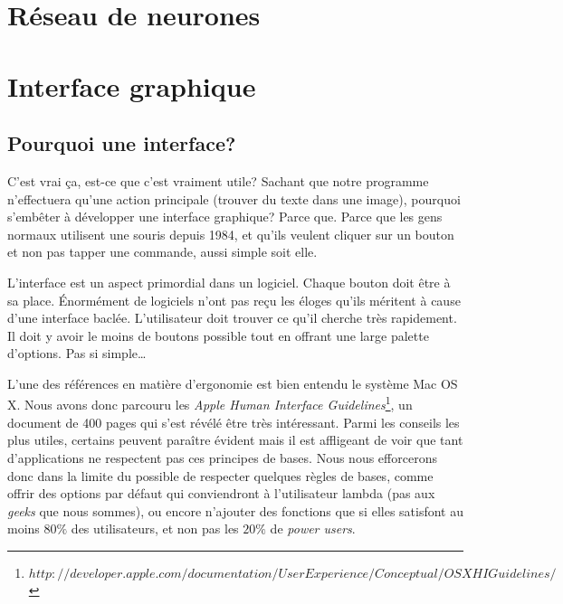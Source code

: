 \documentclass[]{report}
\begin{document}


	\chapter{R\'eseau de neurones} %
	\label{cha:r'eseau_de_neurones}




	\chapter{Interface graphique} %
	\label{cha:interface_graphique}
		\section{Pourquoi une interface?} %
		\label{sec:pourquoi_une_interface_}
		C'est vrai \c ca, est-ce que c'est vraiment utile? Sachant que notre programme n'effectuera qu'une action principale (trouver du texte dans une image), pourquoi s'emb\^eter \`a d\'evelopper une interface graphique? Parce que. Parce que les gens normaux utilisent une souris depuis 1984, et qu'ils veulent cliquer sur un bouton et non pas tapper une commande, aussi simple soit elle.
		
		L'interface est un aspect primordial dans un logiciel. Chaque bouton doit \^etre \`a sa place. \'Enorm\'ement de logiciels n'ont pas re\c cu les \'eloges qu'ils m\'eritent \`a cause d'une interface bacl\'ee. L'utilisateur doit trouver ce qu'il cherche tr\`es rapidement. Il doit y avoir le moins de boutons possible tout en offrant une large palette d'options. Pas si simple\ldots
		
		L'une des r\'ef\'erences en mati\`ere d'ergonomie est bien entendu le syst\`eme Mac OS X. Nous avons donc parcouru les \emph{Apple Human Interface Guidelines}\footnote{$http://developer.apple.com/documentation/UserExperience/Conceptual/OSXHIGuidelines/$}, un document de 400 pages qui s'est r\'ev\'el\'e \^etre tr\`es int\'eressant. Parmi les conseils les plus utiles, certains peuvent para\^itre \'evident mais il est affligeant de voir que tant d'applications ne respectent pas ces principes de bases. Nous nous efforcerons donc dans la limite du possible de respecter quelques r\`egles de bases, comme offrir des options par d\'efaut qui conviendront \`a l'utilisateur lambda (pas aux \emph{geeks} que nous sommes), ou encore n'ajouter des fonctions que si elles satisfont au moins $80\%$ des utilisateurs, et non pas les $20\%$ de \emph{power users}.
		
\end{document}

